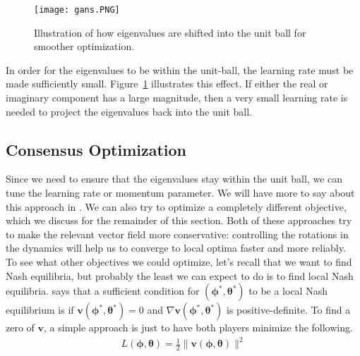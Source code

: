 \documentclass{article}
\renewcommand{\vec}[1]{\ensuremath{\boldsymbol{#1}}}
\newcommand{\btheta}[0]{\ensuremath{\boldsymbol{\theta}}}
\newcommand{\bphi}[0]{\ensuremath{\boldsymbol{\phi}}}
\newcommand{\vecfield}{\vec{v}}
\begin{document}
\begin{figure}[h!]
    \centering
    \texttt{[image: gans.PNG]}
    \caption{Illustration of how eigenvalues are shifted into the unit ball for smoother optimization.}
    \label{fig:eval}
\end{figure}

In order for the eigenvalues to be within the unit-ball, the learning rate must be made sufficiently small. Figure~\ref{fig:eval} illustrates this effect. If either the real or imaginary component has a large magnitude, then a very small learning rate is needed to project the eigenvalues back into the unit ball. %
\\

\subsection{Consensus Optimization}
Since we need to ensure that the eigenvalues stay within the unit ball, we can tune the learning rate or momentum parameter. We will have more to say about this approach in . We can also try to optimize a completely different objective, which we discuss for the remainder of this section. Both of these approaches try to make the relevant vector field more conservative: controlling the rotations in the dynamics will help us to converge to local optima faster and more reliably.
\\

To see what other objectives we could optimize, let's recall that we want to find Nash equilibria, but probably the least we can expect to do is to find local Nash equilibria.  says that a sufficient condition for $(\bphi^*, \btheta^*)$ to be a local Nash equilibrium is if $\vecfield(\bphi^*, \btheta^*) = 0$ and $\nabla \vecfield(\bphi^*, \btheta^*)$ is positive-definite. To find a zero of $\vecfield$, a simple approach is just to have both players minimize the following.
\begin{align}\label{eq:norm-grad-optim}
    L(\vec{\phi}, \vec{\theta}) = \frac{1}{2}\|\vec{v}(\vec{\phi}, \vec{\theta})\|^2
\end{align}
\end{document}
